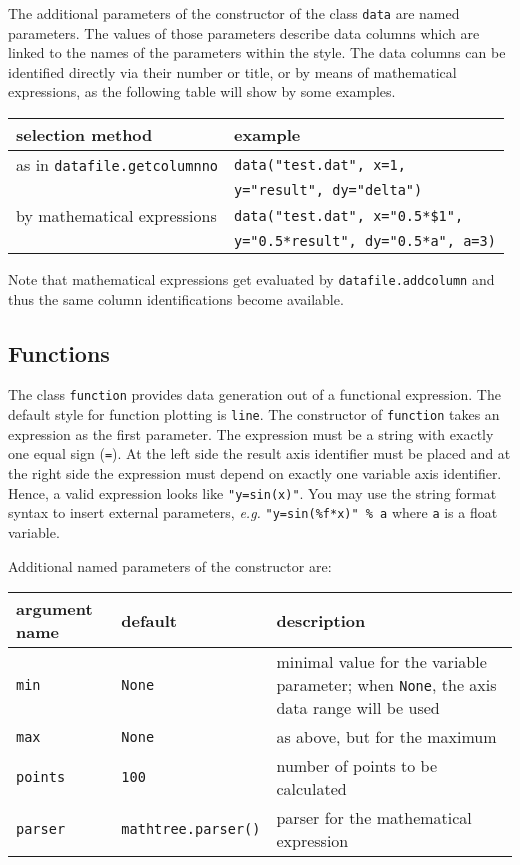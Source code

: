 The additional parameters of the constructor of the class \verb|data|
are named parameters. The values of those parameters describe data
columns which are linked to the names of the parameters within the
style. The data columns can be identified directly via their number or
title, or by means of mathematical expressions, as the following table
will show by some examples.

\begin{center}
\begin{tabular}{ll}
selection method&example\\
\hline
as in \texttt{datafile.getcolumnno}&\texttt{data("test.dat", x=1,}\\
&\texttt{\hphantom{data(}y="result", dy="delta")}\\
by mathematical expressions&\texttt{data("test.dat", x="0.5*\$1",}\\
&\texttt{\hphantom{data(}y="0.5*result", dy="0.5*a", a=3)}\\
\end{tabular}
\end{center}

Note that mathematical expressions get evaluated by
\verb|datafile.addcolumn| and thus the same column identifications
become available.

\subsection{Functions}

The class \verb|function| provides data generation out of a functional
expression. The default style for function plotting is \verb|line|.
The constructor of \verb|function| takes an expression as the first
parameter. The expression must be a string with exactly one equal sign
(\verb|=|). At the left side the result axis identifier must be placed
and at the right side the expression must depend on exactly one
variable axis identifier. Hence, a valid expression looks like
\verb|"y=sin(x)"|. You may use the string format syntax to insert
external parameters, \textit{e.g.} \verb|"y=sin(%f*x)" % a| where
\verb|a| is a float variable.

Additional named parameters of the constructor are:

\medskip
\begin{tabularx}{\linewidth}{ll>{\raggedright\arraybackslash}X}
argument name&default&description\\
\hline
\texttt{min}&\texttt{None}&minimal value for the variable parameter; when \texttt{None}, the axis data range will be used\\
\texttt{max}&\texttt{None}&as above, but for the maximum\\
\texttt{points}&\texttt{100}&number of points to be calculated\\
\texttt{parser}&\texttt{mathtree.parser()}&parser for the mathematical expression\\
\end{tabularx}
\medskip

